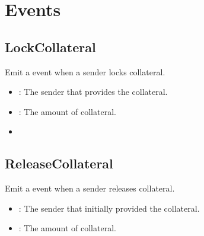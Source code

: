 \documentclass[a4paper,10pt,english]{sphinxmanual}
\begin{document}
\section{Events}
\label{\detokenize{spec/collateral:events}}

\subsection{LockCollateral}
\label{\detokenize{spec/collateral:id10}}
Emit a  event when a sender locks collateral.



\begin{itemize}
\item {} 
: The sender that provides the collateral.

\item {} 
: The amount of collateral.

\end{itemize}

\begin{itemize}
\item {} 
{\hyperref[\detokenize{spec/collateral:lockcollateral}]{}}

\end{itemize}


\subsection{ReleaseCollateral}
\label{\detokenize{spec/collateral:id11}}
Emit a  event when a sender releases collateral.



\begin{itemize}
\item {} 
: The sender that initially provided the collateral.

\item {} 
: The amount of collateral.

\end{itemize}
\end{document}
